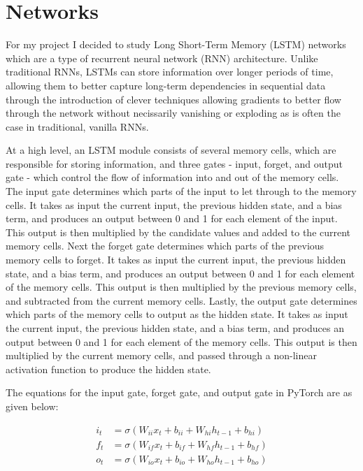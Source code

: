 \documentclass[12pt, twoside]{report}
\begin{document}
\section{Networks}

For my project I decided to study Long Short-Term Memory (LSTM) networks which are a type of 
recurrent neural network (RNN) architecture.
Unlike traditional RNNs, LSTMs can store information over longer periods of time, allowing them to better 
capture long-term dependencies in sequential data through the introduction of clever techniques allowing
gradients to better flow through the network without necissarily vanishing or exploding as is often the case
in traditional, vanilla RNNs.

At a high level, an LSTM module consists of several memory cells, which are responsible for storing information, 
and three gates - input, forget, and output gate - which control the flow of information into and out of the memory cells.
The input gate determines which parts of the input to let through to the memory cells.
It takes as input the current input, the previous hidden state, and a bias term, and produces an output between 0 and 1 
for each element of the input.
This output is then multiplied by the candidate values and added to the current memory cells.
Next the forget gate determines which parts of the previous memory cells to forget.
It takes as input the current input, the previous hidden state, and a bias term, and produces an output between 0 and 1 
for each element of the memory cells.
This output is then multiplied by the previous memory cells, and subtracted from the current memory cells.
Lastly, the output gate determines which parts of the memory cells to output as the hidden state.
It takes as input the current input, the previous hidden state, and a bias term, and produces an output between 0 and 1 
for each element of the memory cells.
This output is then multiplied by the current memory cells, and passed through a non-linear activation function to 
produce the hidden state.

The equations for the input gate, forget gate, and output gate in PyTorch are as given below:

\begin{align}
    i_t &= \sigma(W_{ii} x_t + b_{ii} + W_{hi} h_{t-1} + b_{hi}) \\
    f_t &= \sigma(W_{if} x_t + b_{if} + W_{hf} h_{t-1} + b_{hf}) \\
    o_t &= \sigma(W_{io} x_t + b_{io} + W_{ho} h_{t-1} + b_{ho})
\end{align}
\end{document}
